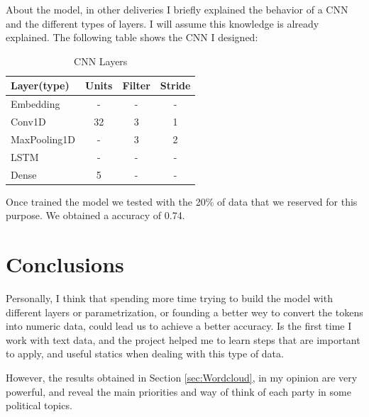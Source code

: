 \documentclass{article}
\begin{document}
About the model, in other deliveries I briefly explained the behavior of a CNN and the different types of layers. I will assume this knowledge is already explained. The following table shows the CNN I designed:

\begin{table}[ht]
    \centering
    \begin{tabular}{|l|ccc|}
        \hline
        \textbf{Layer(type)} & \textbf{Units} & \textbf{Filter} & \textbf{Stride} \\
        \hline
        Embedding & - & - & - \\ \hline
        Conv1D & 32 & 3 & 1\\ \hline
        MaxPooling1D & - & 3 & 2\\ \hline
        LSTM & - & - & -\\ \hline
        Dense & 5 & - & -\\ \hline

    \end{tabular}
    \caption{CNN Layers}
    \label{tab:CNN_Layers}
\end{table}

Once trained the model we tested with the 20\% of data that we reserved for this purpose. We obtained a accuracy of 0.74. 

\section{Conclusions}
Personally, I think that spending more time trying to build the model with different layers or parametrization, or founding a better wey to convert the tokens into numeric data, could lead us to achieve a better accuracy. Is the first time I work with text data, and the project helped me to learn steps that are important to apply, and useful statics when dealing with this type of data.

However, the results obtained in Section \ref{sec:Wordcloud}, in my opinion are very powerful, and reveal the main priorities and way of think of each party in some political topics. 
\end{document}
